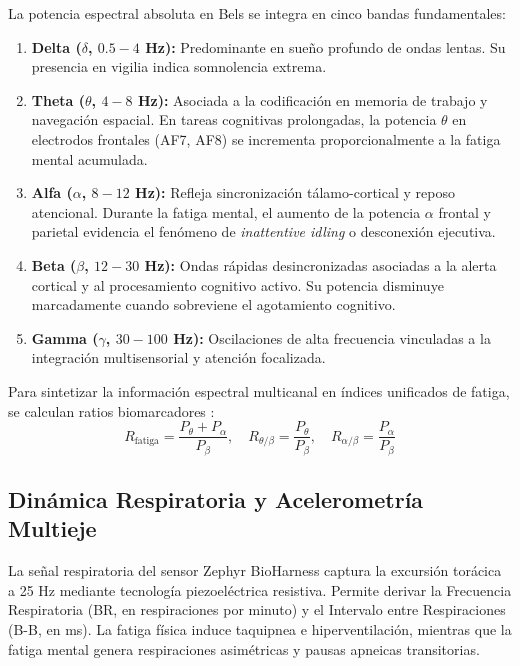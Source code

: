 La potencia espectral absoluta en Bels se integra en cinco bandas fundamentales:
\begin{enumerate}
    \item \textbf{Delta ($\delta$, $0.5 - 4$ Hz):} Predominante en sueño profundo de ondas lentas. Su presencia en vigilia indica somnolencia extrema.
    \item \textbf{Theta ($\theta$, $4 - 8$ Hz):} Asociada a la codificación en memoria de trabajo y navegación espacial. En tareas cognitivas prolongadas, la potencia $\theta$ en electrodos frontales (AF7, AF8) se incrementa proporcionalmente a la fatiga mental acumulada.
    \item \textbf{Alfa ($\alpha$, $8 - 12$ Hz):} Refleja sincronización tálamo-cortical y reposo atencional. Durante la fatiga mental, el aumento de la potencia $\alpha$ frontal y parietal evidencia el fenómeno de \textit{inattentive idling} o desconexión ejecutiva.
    \item \textbf{Beta ($\beta$, $12 - 30$ Hz):} Ondas rápidas desincronizadas asociadas a la alerta cortical y al procesamiento cognitivo activo. Su potencia disminuye marcadamente cuando sobreviene el agotamiento cognitivo.
    \item \textbf{Gamma ($\gamma$, $30 - 100$ Hz):} Oscilaciones de alta frecuencia vinculadas a la integración multisensorial y atención focalizada.
\end{enumerate}

Para sintetizar la información espectral multicanal en índices unificados de fatiga, se calculan ratios biomarcadores \cite{klimesch1999eeg}:
\begin{equation}
    R_{\text{fatiga}} = \frac{P_\theta + P_\alpha}{P_\beta}, \quad R_{\theta/\beta} = \frac{P_\theta}{P_\beta}, \quad R_{\alpha/\beta} = \frac{P_\alpha}{P_\beta}
\end{equation}

\subsection{Dinámica Respiratoria y Acelerometría Multieje}

La señal respiratoria del sensor Zephyr BioHarness captura la excursión torácica a 25 Hz mediante tecnología piezoeléctrica resistiva. Permite derivar la Frecuencia Respiratoria (BR, en respiraciones por minuto) y el Intervalo entre Respiraciones (B-B, en ms). La fatiga física induce taquipnea e hiperventilación, mientras que la fatiga mental genera respiraciones asimétricas y pausas apneicas transitorias.

